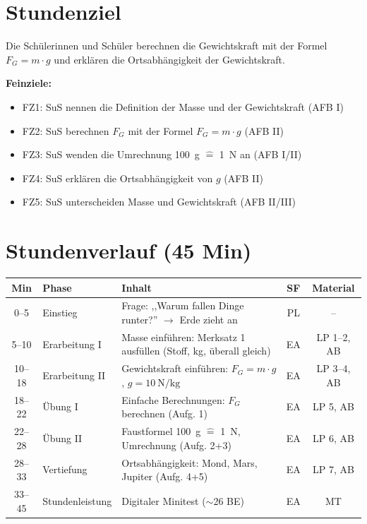 \documentclass[a4paper,11pt]{article}
\begin{document}

\section*{Stundenziel}

Die Schülerinnen und Schüler berechnen die Gewichtskraft mit der Formel $F_G = m \cdot g$ und erklären die Ortsabhängigkeit der Gewichtskraft.

\vspace{3mm}

\textbf{Feinziele:}
\begin{itemize}[nosep]
    \item FZ1: SuS nennen die Definition der Masse und der Gewichtskraft (AFB I)
    \item FZ2: SuS berechnen $F_G$ mit der Formel $F_G = m \cdot g$ (AFB II)
    \item FZ3: SuS wenden die Umrechnung \SI{100}{\gram} $\hat{=}$ \SI{1}{\newton} an (AFB I/II)
    \item FZ4: SuS erklären die Ortsabhängigkeit von $g$ (AFB II)
    \item FZ5: SuS unterscheiden Masse und Gewichtskraft (AFB II/III)
\end{itemize}

\vspace{5mm}


\section*{Stundenverlauf (45 Min)}

\begin{tabularx}{\textwidth}{|c|l|X|c|c|}
\hline
\textbf{Min} & \textbf{Phase} & \textbf{Inhalt} & \textbf{SF} & \textbf{Material} \\
\hline
0--5 & Einstieg & Frage: ,,Warum fallen Dinge runter?'' $\rightarrow$ Erde zieht an & PL & -- \\
\hline
5--10 & Erarbeitung I & Masse einführen: Merksatz 1 ausfüllen (Stoff, kg, überall gleich) & EA & LP 1--2, AB \\
\hline
10--18 & Erarbeitung II & Gewichtskraft einführen: $F_G = m \cdot g$, $g = \SI{10}{\newton\per\kilogram}$ & EA & LP 3--4, AB \\
\hline
18--22 & Übung I & Einfache Berechnungen: $F_G$ berechnen (Aufg. 1) & EA & LP 5, AB \\
\hline
22--28 & Übung II & Faustformel \SI{100}{\gram} $\hat{=}$ \SI{1}{\newton}, Umrechnung (Aufg. 2+3) & EA & LP 6, AB \\
\hline
28--33 & Vertiefung & Ortsabhängigkeit: Mond, Mars, Jupiter (Aufg. 4+5) & EA & LP 7, AB \\
\hline
33--45 & Stundenleistung & Digitaler Minitest ($\sim$26 BE) & EA & MT \\
\hline
\end{tabularx}
\end{document}
